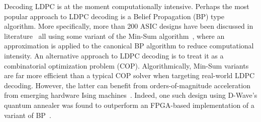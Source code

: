 Decoding LDPC is at the moment computationally intensive. 
Perhaps the most popular approach to LDPC decoding 
is a Belief Propagation (BP) type algorithm. More specifically, more than 200 ASIC
designs have been discussed in literature~\cite{shao2019survey,soton399259} 
all using some variant of
the Min-Sum algorithm~\cite{fossorier1999reduced}, where an
approximation is applied to the canonical BP algorithm to reduce 
computational intensity. 
An alternative approach to LDPC decoding is to treat it as a 
combinatorial optimization problem (COP). 
Algorithmically, Min-Sum variants are far more efficient 
than a typical COP solver when targeting
real-world LDPC decoding. However, the latter can benefit from 
orders-of-magnitude acceleration from emerging hardware
Ising machines~\cite{afoakwa.hpca21, inagaki2016cim, DBLP:journals/corr/abs-1903-07163}. 
Indeed, one such design using D-Wave's quantum annealer was found
to outperform an FPGA-based implementation of a variant of BP~\cite{kasi2020towards}.


